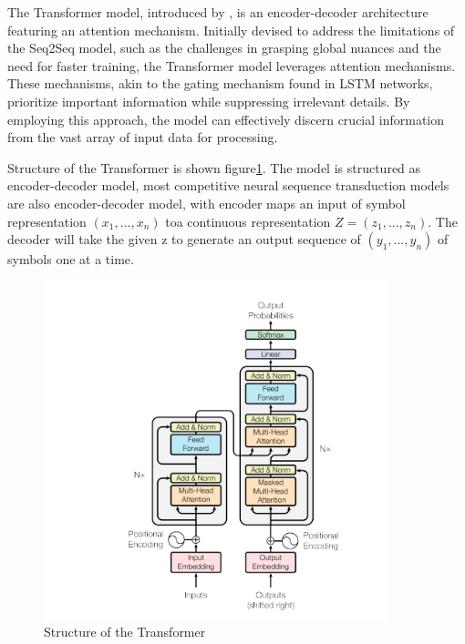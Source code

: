 The Transformer model, introduced by \cite{vaswani2023attention}, is an encoder-decoder architecture featuring an attention mechanism. Initially devised to address the limitations of the Seq2Seq model, such as the challenges in grasping global nuances and the need for faster training, the Transformer model leverages attention mechanisms. These mechanisms, akin to the gating mechanism found in LSTM networks, prioritize important information while suppressing irrelevant details. By employing this approach, the model can effectively discern crucial information from the vast array of input data for processing.

Structure of the Transformer is shown figure\ref{fig:transformer}. The model is structured as encoder-decoder model, most competitive neural sequence transduction models are also encoder-decoder model, with encoder maps an input of symbol representation $(x_1, ...,x_n)$ toa continuous representation $Z=(z_1,...,z_n)$. The decoder will take the given z to generate an output sequence of $(y_1,...,y_n)$ of symbols one at a time.

\begin{figure}[htbp]
    \begin{center}
        \includegraphics[width=10cm]{img/transformer.png}
        \caption{Structure of the Transformer}\label{fig:transformer}
    \end{center}
\end{figure}


